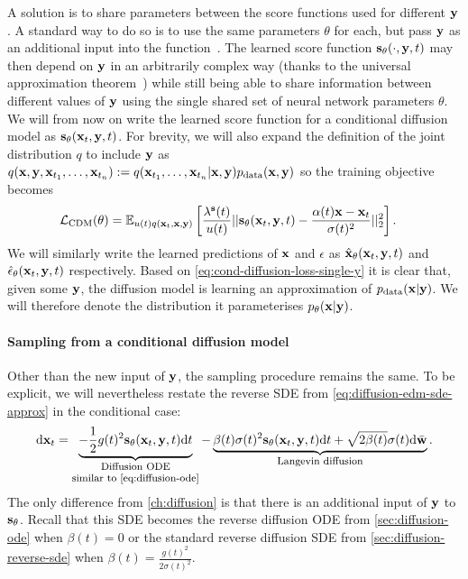 A solution is to share parameters between the score functions used for different ${\mathbf{y}}$. A standard way to do so is to use the same parameters $\theta$ for each, but pass ${\mathbf{y}}$ as an additional input into the function~\citep{sohn2015learning}. The learned score function ${\mathbf{s}}_\theta(\cdot, {\mathbf{y}}, t)$ may then depend on ${\mathbf{y}}$ in an arbitrarily complex way (thanks to the universal approximation theorem~\citep{hornik1989multilayer}) while still being able to share information between different values of ${\mathbf{y}}$ using the single shared set of neural network parameters $\theta$. We will from now on write the learned score function for a conditional diffusion model as ${\mathbf{s}}_\theta({\mathbf{x}}_t, {\mathbf{y}}, t)$. For brevity, we will also expand the definition of the joint distribution $q$ to include ${\mathbf{y}}$ as $q({\mathbf{x}},{\mathbf{y}},{\mathbf{x}}_{t_1},\ldots,{\mathbf{x}}_{t_n}) := q({\mathbf{x}}_{t_1},\ldots,{\mathbf{x}}_{t_n}|{\mathbf{x}},{\mathbf{y}})p_{\rm{data}}({\mathbf{x}},{\mathbf{y}})$ so the training objective becomes
\begin{align} \label{eq:cond-diffusion-loss}
    {\mathcal{L}}_\text{CDM}(\theta) &= \mathbb{E}_{u(t)q({\mathbf{x}}_t, {\mathbf{x}}, {\mathbf{y}})} \left[ \frac{\lambda^{\mathbf{s}}(t)}{u(t)} 
    || {\mathbf{s}}_{\theta}({\mathbf{x}}_t, {\mathbf{y}}, t) - \frac{\alpha(t){\mathbf{x}}-{\mathbf{x}}_t}{\sigma(t)^2} ||_2^2 \right].
\end{align}
We will similarly write the learned predictions of ${\mathbf{x}}$ and $\epsilon$ as $\hat{{\mathbf{x}}}_{\theta}({\mathbf{x}}_t, {\mathbf{y}}, t)$ and $\hat{\mathbf{\epsilon}}_{\theta}({\mathbf{x}}_t, {\mathbf{y}}, t)$ respectively.
Based on \cref{eq:cond-diffusion-loss-single-y} it is clear that, given some ${\mathbf{y}}$, the diffusion model is learning an approximation of $p_{\rm{data}}({\mathbf{x}}|{\mathbf{y}})$. We will therefore denote the distribution it parameterises $p_\theta({\mathbf{x}}|{\mathbf{y}})$.

\paragraph{Sampling from a conditional diffusion model}
Other than the new input of ${\mathbf{y}}$, the sampling procedure remains the same. To be explicit, we will nevertheless restate the reverse SDE from \cref{eq:diffusion-edm-sde-approx} in the conditional case:
\begin{align}
    \mathrm{d}\rvx_t = \underbrace{- \frac{1}{2} g(t)^2 \rvs_\theta(\rvx_t, \rvy, t) \mathrm{d}t}_{\shortstack{\footnotesize Diffusion ODE \\ \footnotesize similar to \cref{eq:diffusion-ode}}} - \underbrace{\beta(t) \sigma(t)^2 \rvs_\theta(\rvx_t, \rvy, t) \mathrm{d}t + \sqrt{2\beta(t)}\sigma(t)\mathrm{d}\bar{\rvw}}_\text{\footnotesize Langevin diffusion}.
\end{align}
The only difference from \cref{ch:diffusion} is that there is an additional input of ${\mathbf{y}}$ to ${\mathbf{s}}_\theta$. Recall that this SDE becomes the reverse diffusion ODE from \cref{sec:diffusion-ode} when $\beta(t) = 0$ or the standard reverse diffusion SDE from \cref{sec:diffusion-reverse-sde} when $\beta(t) = \frac{g(t)^2}{2 \sigma(t)^2}$.

